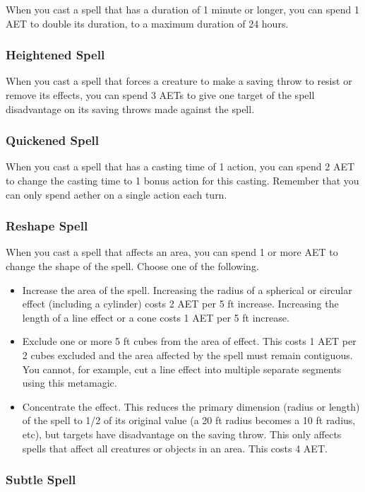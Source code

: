 When you cast a spell that has a duration of 1 minute or longer, you can spend 1 AET to double its duration, to a maximum duration of 24 hours.

\subsubsection{Heightened Spell}

When you cast a spell that forces a creature to make a saving throw to resist or remove its effects, you can spend 3 AETs to give one target of the spell disadvantage on its saving throws made against the spell.

\subsubsection{Quickened Spell}

When you cast a spell that has a casting time of 1 action, you can spend 2 AET to change the casting time to 1 bonus action for this casting. Remember that you can only spend aether on a single action each turn.

\subsubsection{Reshape Spell}
When you cast a spell that affects an area, you can spend 1 or more AET to change the shape of the spell. Choose one of the following.
\begin{itemize}
  \item Increase the area of the spell. Increasing the radius of a spherical or circular effect (including a cylinder) costs 2 AET per 5 ft increase. Increasing the length of a line effect or a cone costs 1 AET per 5 ft increase.
  \item Exclude one or more 5 ft cubes from the area of effect. This costs 1 AET per 2 cubes excluded and the area affected by the spell must remain contiguous. You cannot, for example, cut a line effect into multiple separate segments using this metamagic.
  \item Concentrate the effect. This reduces the primary dimension (radius or length) of the spell to 1/2 of its original value (a 20 ft radius becomes a 10 ft radius, etc), but targets have disadvantage on the saving throw. This only affects spells that affect all creatures or objects in an area. This costs 4 AET.
\end{itemize}

\subsubsection{Subtle Spell}

